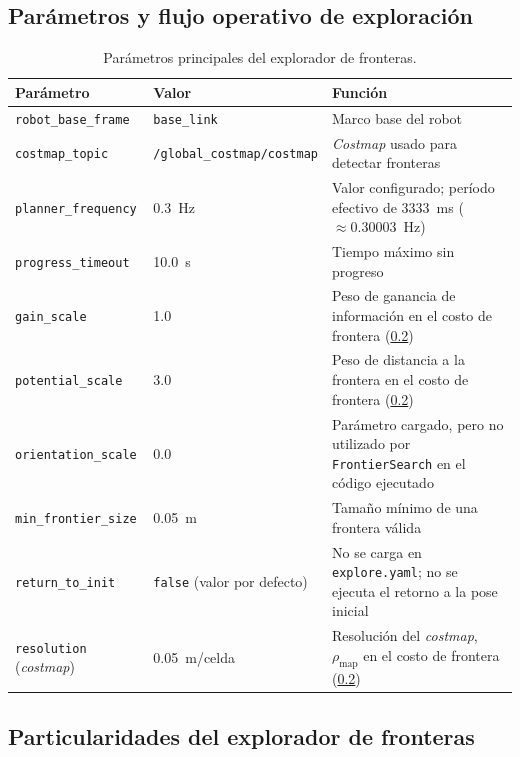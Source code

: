 \begin{appendices}
\subsection{Parámetros y flujo operativo de exploración}

\begin{table}[H]
\centering
\caption{Parámetros principales del explorador de fronteras.}
\label{tab:explore_params_ch9}
\small
\begin{tabular}{p{3.5cm} p{4.5cm} p{5.8cm}}
\toprule
\textbf{Parámetro} & \textbf{Valor} & \textbf{Función} \\
\midrule
\texttt{robot\_base\_frame} & \texttt{base\_link} & Marco base del robot \\
\texttt{costmap\_topic} & \texttt{/global\_\allowbreak{}costmap/\allowbreak{}costmap} & \textit{Costmap} usado para detectar fronteras \\
\texttt{planner\_frequency} & 0.3~Hz & Valor configurado; período efectivo de 3333~ms ($\approx0.30003$~Hz) \\
\texttt{progress\_timeout} & 10.0~s & Tiempo máximo sin progreso \\
\texttt{gain\_scale} & 1.0 & Peso de ganancia de información en el costo de frontera (\ref{anx:explore_impl}) \\
\texttt{potential\_scale} & 3.0 & Peso de distancia a la frontera en el costo de frontera (\ref{anx:explore_impl}) \\
\texttt{orientation\_scale} & 0.0 & Parámetro cargado, pero no utilizado por \texttt{FrontierSearch} en el código ejecutado \\
\texttt{min\_frontier\_size} & 0.05~m & Tamaño mínimo de una frontera válida \\
\texttt{return\_to\_init} & \texttt{false} (valor por defecto) & No se carga en \texttt{explore.yaml}; no se ejecuta el retorno a la pose inicial \\
\texttt{resolution} (\textit{costmap}) & 0.05~m/celda & Resolución del \textit{costmap}, $\rho_{\mathrm{map}}$ en el costo de frontera (\ref{anx:explore_impl}) \\
\bottomrule
\end{tabular}
\end{table}

\subsection{Particularidades del explorador de fronteras}
\label{anx:explore_impl}


\end{appendices}
